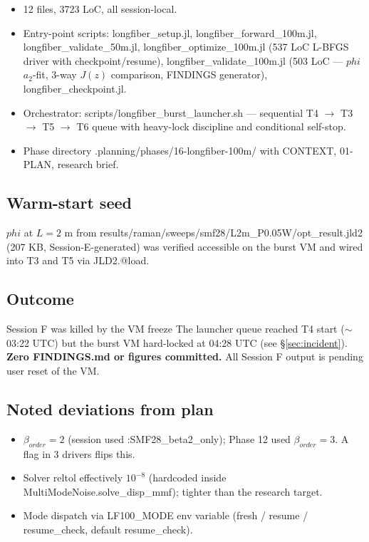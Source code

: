 \documentclass[11pt,letterpaper]{article}
\def\varphi{phi}%
\def\mathrm#1{#1}%
\def\texttt#1{#1}%
\begin{document}
\begin{itemize}[leftmargin=*]
  \item 12 files, 3723 LoC, all session-local.
  \item Entry-point scripts: \texttt{longfiber\_setup.jl}, \texttt{longfiber\_forward\_100m.jl}, \texttt{longfiber\_validate\_50m.jl}, \texttt{longfiber\_optimize\_100m.jl} (537 LoC L-BFGS driver with checkpoint/resume), \texttt{longfiber\_validate\_100m.jl} (503 LoC --- $\varphi$ $a_2$-fit, 3-way $J(z)$ comparison, FINDINGS generator), \texttt{longfiber\_checkpoint.jl}.
  \item Orchestrator: \texttt{scripts/longfiber\_burst\_launcher.sh} --- sequential T4 $\to$ T3 $\to$ T5 $\to$ T6 queue with heavy-lock discipline and conditional self-stop.
  \item Phase directory \texttt{.planning/phases/16-longfiber-100m/} with CONTEXT, 01-PLAN, research brief.
\end{itemize}

\subsection{Warm-start seed}

$\varphi$ at $L = 2$ m from \texttt{results/raman/sweeps/smf28/L2m\_P0.05W/opt\_result.jld2} (207 KB, Session-E-generated) was verified accessible on the burst VM and wired into T3 and T5 via \texttt{JLD2.@load}.

\subsection{Outcome}

\begin{blocker}{Session F was killed by the VM freeze}
The launcher queue reached T4 start ($\sim$03:22 UTC) but the burst VM hard-locked at 04:28 UTC (see \S\ref{sec:incident}). \textbf{Zero FINDINGS.md or figures committed.} All Session F output is pending user reset of the VM.
\end{blocker}

\subsection{Noted deviations from plan}

\begin{itemize}[leftmargin=*]
  \item $\beta_{\mathrm{order}} = 2$ (session used \texttt{:SMF28\_beta2\_only}); Phase 12 used $\beta_{\mathrm{order}} = 3$. A flag in 3 drivers flips this.
  \item Solver \texttt{reltol} effectively $10^{-8}$ (hardcoded inside \texttt{MultiModeNoise.solve\_disp\_mmf}); tighter than the research target.
  \item Mode dispatch via \texttt{LF100\_MODE} env variable (\texttt{fresh} / \texttt{resume} / \texttt{resume\_check}, default \texttt{resume\_check}).
\end{itemize}
\end{document}
